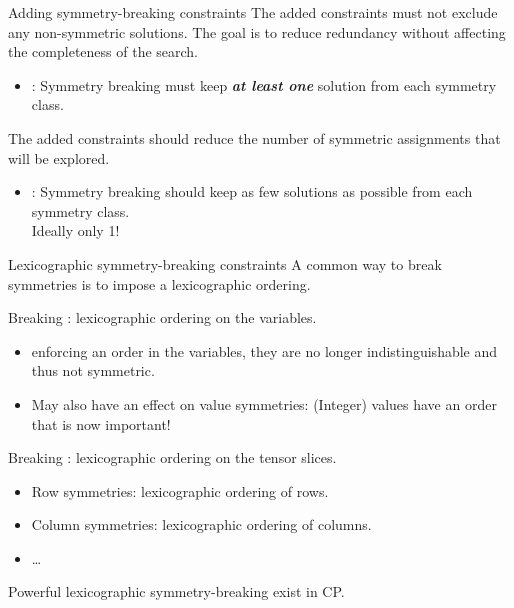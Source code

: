 \documentclass{cons-beamer}
\begin{document}
\begin{frame}{Adding symmetry-breaking constraints}
  The added constraints must not exclude any non-symmetric solutions. The goal is to reduce redundancy without affecting the completeness of the search.\\[+5pt]
  \begin{itemize}
    \item {}: Symmetry breaking must keep \textbf{\textit{at least one}} solution from each symmetry class.
  \end{itemize}
  \vfill 

  The added constraints should reduce the number of symmetric assignments that will be explored.\\[+5pt]
  \begin{itemize}
    \item {}: Symmetry breaking should keep as few solutions as possible from each symmetry class. \\ \alert{Ideally only 1!}
  \end{itemize}
\end{frame}

\begin{frame}{Lexicographic symmetry-breaking constraints}
  A common way to break symmetries is to impose a lexicographic ordering.
  \vfill

  Breaking : lexicographic ordering on the variables.
  \vfill

  \begin{itemize}
    \item  enforcing an order in the variables, they are no longer indistinguishable and thus not symmetric. 
    \item May also have an effect on value symmetries: (Integer) values have an order that is now important!
  \end{itemize}
  \vfill

  Breaking : lexicographic ordering on the tensor slices.
  \begin{itemize}
    \item Row symmetries: lexicographic ordering of rows.
    \item Column symmetries: lexicographic ordering of columns.
    \item \dots
  \end{itemize}
  \vfill

  Powerful lexicographic symmetry-breaking  exist in CP.
\end{frame}
\end{document}
